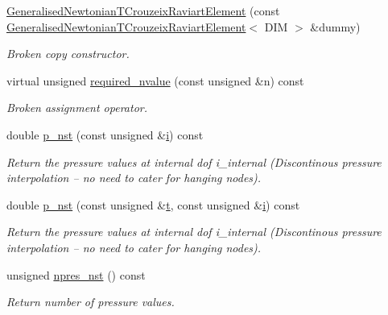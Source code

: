 \begin{DoxyCompactItemize}
\hyperlink{classoomph_1_1GeneralisedNewtonianTCrouzeixRaviartElement_af661655ed2a7d84e5fc0d8ac239e5eff}{Generalised\+Newtonian\+T\+Crouzeix\+Raviart\+Element} (const \hyperlink{classoomph_1_1GeneralisedNewtonianTCrouzeixRaviartElement}{Generalised\+Newtonian\+T\+Crouzeix\+Raviart\+Element}$<$ D\+IM $>$ \&dummy)
\begin{DoxyCompactList}\small\item\em Broken copy constructor. \end{DoxyCompactList}\item 
virtual unsigned \hyperlink{classoomph_1_1GeneralisedNewtonianTCrouzeixRaviartElement_ab9fad5277d1b5b64119be4cc5a8d2aad}{required\+\_\+nvalue} (const unsigned \&n) const
\begin{DoxyCompactList}\small\item\em Broken assignment operator. \end{DoxyCompactList}\item 
double \hyperlink{classoomph_1_1GeneralisedNewtonianTCrouzeixRaviartElement_aacae104194ac35d57f2172372e0d90a5}{p\+\_\+nst} (const unsigned \&\hyperlink{cfortran_8h_adb50e893b86b3e55e751a42eab3cba82}{i}) const
\begin{DoxyCompactList}\small\item\em Return the pressure values at internal dof i\+\_\+internal (Discontinous pressure interpolation -- no need to cater for hanging nodes). \end{DoxyCompactList}\item 
double \hyperlink{classoomph_1_1GeneralisedNewtonianTCrouzeixRaviartElement_a8338447861d4a7757eafc8eeda941643}{p\+\_\+nst} (const unsigned \&\hyperlink{cfortran_8h_af6f0bd3dc13317f895c91323c25c2b8f}{t}, const unsigned \&\hyperlink{cfortran_8h_adb50e893b86b3e55e751a42eab3cba82}{i}) const
\begin{DoxyCompactList}\small\item\em Return the pressure values at internal dof i\+\_\+internal (Discontinous pressure interpolation -- no need to cater for hanging nodes). \end{DoxyCompactList}\item 
unsigned \hyperlink{classoomph_1_1GeneralisedNewtonianTCrouzeixRaviartElement_a9292803fedb1000c418070b5c459834b}{npres\+\_\+nst} () const
\begin{DoxyCompactList}\small\item\em Return number of pressure values. \end{DoxyCompactList}\item 

\end{DoxyCompactItemize}
